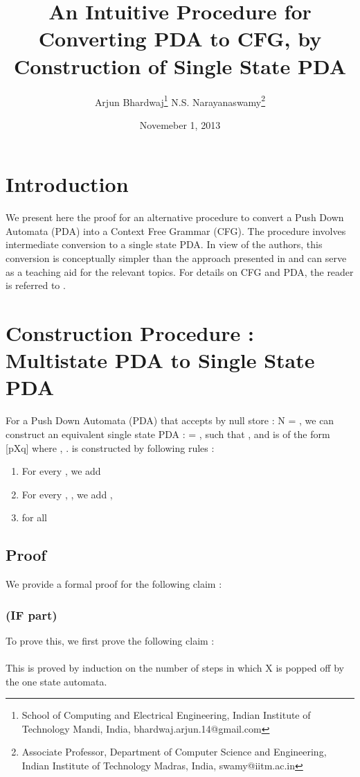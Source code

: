\documentclass[11pt,a4paper,portrait]{extarticle}
\title{An Intuitive Procedure for Converting PDA to CFG, by Construction of Single State PDA}
\author{
Arjun Bhardwaj\thanks{School of Computing and Electrical Engineering, Indian Institute of Technology Mandi, India, bhardwaj.arjun.14@gmail.com} \:\: N.S. Narayanaswamy\thanks{Associate Professor, Department of Computer Science and Engineering, Indian Institute of Technology Madras, India, swamy@iitm.ac.in}
}
\date{Novemeber 1, 2013}
\begin{document}
\maketitle

\section{Introduction}
We present here the proof for an alternative procedure to convert a Push Down Automata (PDA) into a Context Free Grammar (CFG). The procedure involves intermediate conversion to a single state PDA. In view of the authors, this conversion is conceptually simpler than the approach presented in \cite{ull} and can serve as a teaching aid for the relevant topics. For details on CFG and PDA, the reader is referred to \cite{ull}.

\section{Construction Procedure : Multistate PDA to Single State PDA}

For a Push Down Automata (PDA) that accepts by null store : N = , we can construct an equivalent single state PDA :  = ,
such that , and  is of the form [pXq] where , . 
 is constructed by following rules :\\
\begin{enumerate}
\item For every , we add 
\item For every , , we add , 
\item  for all 
\end{enumerate}

\subsection {Proof}

We provide a formal proof for the following claim : 

\subsubsection{(IF part) }

To prove this, we first prove the following claim :\\
\\

This is proved by induction on the number of steps in which X is popped off by the one state automata.\\
\end{document}
